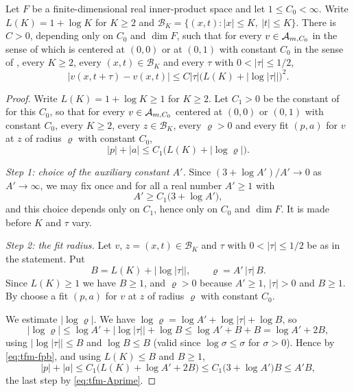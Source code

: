 \begin{lemma}
Let $F$ be a finite-dimensional real inner-product space and let
$1\le C_0<\infty$. Write $L(K)=1+\log K$ for $K\ge2$ and
$\mathcal B_K=\{(x,t):|x|\le K,\ |t|\le K\}$. There is $C>0$, depending only on
$C_0$ and $\dim F$, such that for every $v\in\mathcal{A}_{m,C_0}$ in the sense of
 which is centered at $(0,0)$ or at $(0,1)$ with constant
$C_0$ in the sense of , every $K\ge2$, every
$(x,t)\in\mathcal B_K$ and every $\tau$ with $0<|\tau|\le1/2$,
\begin{equation}\label{eq:time-fit-modulus}
  |v(x,t+\tau)-v(x,t)|
    \le C|\tau|\bigl(L(K)+|\log|\tau||\bigr)^2 .
\end{equation}
\end{lemma}
\begin{proof}
Write $L(K)=1+\log K\ge1$ for $K\ge2$. Let $C_1>0$ be the constant of
 for this $C_0$, so that for every $v\in\mathcal{A}_{m,C_0}$
centered at $(0,0)$ or $(0,1)$ with constant $C_0$, every $K\ge2$, every
$z\in\mathcal B_K$, every $\varrho>0$ and every fit $(p,a)$ for $v$ at $z$ of
radius $\varrho$ with constant $C_0$,
\begin{equation}\label{eq:tfm-fpb}
  |p|+|a|\le C_1\bigl(L(K)+|\log\varrho|\bigr).
\end{equation}

\emph{Step 1: choice of the auxiliary constant $A'$.}
Since $(3+\log A')/A'\to0$ as $A'\to\infty$, we may fix once and for all a real
number $A'\ge1$ with
\begin{equation}\label{eq:tfm-Aprime}
  A'\ge C_1\bigl(3+\log A'\bigr),
\end{equation}
and this choice depends only on $C_1$, hence only on $C_0$ and $\dim F$. It is
made before $K$ and $\tau$ vary.

\emph{Step 2: the fit radius.}
Let $v$, $z=(x,t)\in\mathcal B_K$ and $\tau$ with $0<|\tau|\le1/2$ be as in the
statement. Put
\[
  B=L(K)+\bigl|\log|\tau|\bigr|,\qquad \varrho=A'\,|\tau|\,B .
\]
Since $L(K)\ge1$ we have $B\ge1$, and $\varrho>0$ because $A'\ge1$, $|\tau|>0$
and $B\ge1$. By  choose a fit $(p,a)$ for $v$ at $z$ of
radius $\varrho$ with constant $C_0$.

We estimate $|\log\varrho|$. We have
$\log\varrho=\log A'+\log|\tau|+\log B$, so
\[
  |\log\varrho|\le\log A'+\bigl|\log|\tau|\bigr|+\log B
   \le\log A'+B+B=\log A'+2B ,
\]
using $\bigl|\log|\tau|\bigr|\le B$ and $\log B\le B$ (valid since
$\log\sigma\le\sigma$ for $\sigma>0$). Hence by \eqref{eq:tfm-fpb}, and using
$L(K)\le B$ and $B\ge1$,
\begin{equation}\label{eq:tfm-param}
  |p|+|a|\le C_1\bigl(L(K)+\log A'+2B\bigr)
   \le C_1\bigl(3+\log A'\bigr)B\le A'B ,
\end{equation}
the last step by \eqref{eq:tfm-Aprime}.


\end{proof}
